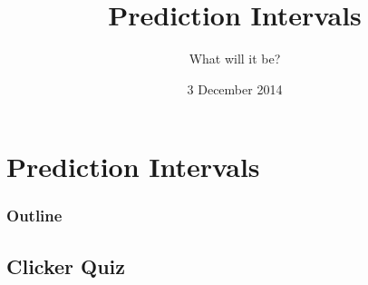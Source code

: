 
\section{Prediction Intervals}

\title{Prediction Intervals}
\subtitle{What will it be?}

\date{3 December 2014}

\begin{frame}
  \titlepage
\end{frame}

\begin{frame}
  \frametitle{Outline}
  \tableofcontents[hideothersubsections,sectionstyle=show/hide]
\end{frame}


\subsection{Clicker Quiz}


